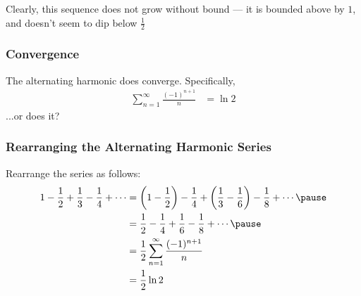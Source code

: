 \documentclass{beamer}
\begin{document}
\begin{frame}
  Clearly, this sequence does not grow without bound --- it is bounded above by $1$, and doesn't seem to dip below $\frac{1}{2}$
\end{frame}
\begin{frame}
  \frametitle{Convergence}
  The alternating harmonic does converge. Specifically,
  \begin{align*}
    \sum_{n=1}^{\infty}\frac{(-1)^{n+1}}{n} &= \ln 2
  \end{align*}\pause
  ...or does it? 
\end{frame}
\begin{frame}
  \frametitle{Rearranging the Alternating Harmonic Series}
  Rearrange the series as follows:
  \begin{align*}
    1 - \frac{1}{2} + \frac{1}{3} - \frac{1}{4} + \cdots &= \left(1-\frac{1}{2}\right) - \frac{1}{4} + \left(\frac{1}{3} - \frac{1}{6}\right) - \frac{1}{8} + \cdots\pause\\
                                                                       &= \frac{1}{2} - \frac{1}{4} + \frac{1}{6} - \frac{1}{8} + \cdots\pause\\
                                                                       &= \frac{1}{2}\sum_{n=1}^{\infty}\frac{(-1)^{n+1}}{n}\\
                                                                       &= \frac{1}{2}\ln 2
  \end{align*}
\end{frame}
\end{document}
